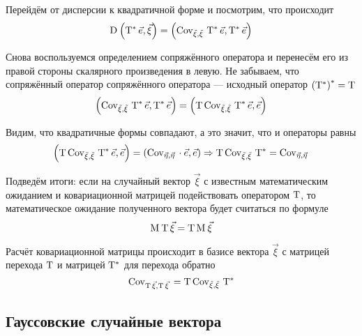 Перейдём от дисперсии к квадратичной форме и посмотрим, что происходит
$$\mathrm{D}_{} \left( \mathrm{T^*}\, {\vec{e}}, \vec{\xi} \right)
    = \left( \mathrm{\mathrm{Cov}_{\vec{\xi}, \vec{\xi}}\,}\, {\mathrm{T^*}\, {\vec{e}}},
        \mathrm{T^*}\, {\vec{e}} \right)$$

Снова воспользуемся определением сопряжённого оператора и перенесём его
из правой стороны скалярного произведения в левую. Не забываем, что
сопряжённый оператор сопряжённого оператора --- исходный оператор
$\left( \mathrm{T^*} \right)^* = \mathrm{T}$
$$\left( \mathrm{\mathrm{Cov}_{\vec{\xi}, \vec{\xi}}\,}\, {\mathrm{T^*}\, {\vec{e}}},
        \mathrm{T^*}\, {\vec{e}} \right)
    = \left( \mathrm{T}\, {
            \mathrm{\mathrm{Cov}_{\vec{\xi}, \vec{\xi}}\,}\, {\mathrm{T^*}\, {\vec{e}}}},
        \vec{e} \right)$$

Видим, что квадратичные формы совпадают, а это значит, что и операторы равны
$$\left( \mathrm{T}\, {
    \mathrm{\mathrm{Cov}_{\vec{\xi}, \vec{\xi}}\,}\, {\mathrm{T^*}\, {\vec{e}}}}, \vec{e} \right)
        = \left( \mathrm{Cov}_{\vec{\eta}, \vec{\eta}}\, \cdot \vec{e}, \vec{e} \right)
    \Rightarrow
    \mathrm{T}\, {\mathrm{\mathrm{Cov}_{\vec{\xi}, \vec{\xi}}\,}\, {\mathrm{T^*}}}
        = \mathrm{Cov}_{\vec{\eta}, \vec{\eta}}\,$$

Подведём итоги: если на случайный вектор $\vec{\xi}$ с известным математическим
ожиданием и ковариационной матрицей подействовать оператором $\mathrm{T}$,
то математическое ожидание полученного вектора будет считаться по формуле
$$\mathrm{M}_{}\,\mathrm{T}\, {\vec{\xi}} = \mathrm{T}\, {\mathrm{M}_{}\,\vec{\xi}}$$

Расчёт ковариационной матрицы происходит в базисе вектора $\vec{\xi}$
с матрицей перехода $\mathrm{T}$ и матрицей $\mathrm{T^*}$
для перехода обратно
$$\mathrm{Cov}_{\mathrm{T}\, {\vec{\xi}}, \mathrm{T}\, {\vec{\xi}}}\,
    = \mathrm{T}\, {\mathrm{\mathrm{Cov}_{\vec{\xi}, \vec{\xi}}\,}\, {\mathrm{T^*}}}$$

\subsection{Гауссовские случайные вектора}
